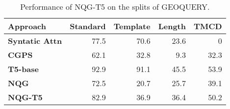 \begin{table}[]
\centering
\scriptsize
\begin{tabular}{lrrrr}
\toprule
\textbf{Approach} &
  \multicolumn{1}{l}{\textbf{Standard}} &
  \multicolumn{1}{l}{\textbf{Template}} &
  \multicolumn{1}{l}{\textbf{Length}} &
  \multicolumn{1}{l}{\textbf{TMCD}} \\
  \midrule
\textbf{Syntatic Attn \cite{russin2019compositional}} & 77.5 & 70.6 & 23.6 & 0    \\
\textbf{CGPS \cite{li2019compositional}}          & 62.1 & 32.8 & 9.3  & 32.3 \\
\textbf{T5-base}       & 92.9 & 91.1 & 45.5 & 53.9 \\
\textbf{NQG}           & 72.5 & 20.7 & 25.7 & 39.1 \\
\textbf{NQG-T5}        & 82.9 & 36.9 & 36.4 & 50.2 \\
\midrule
\end{tabular}
\caption{Performance of NQG-T5 on the splits of GEOQUERY.}
\label{tab:nqg-perf}
\end{table}